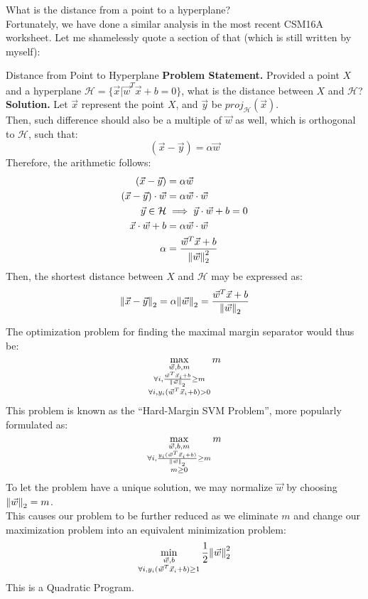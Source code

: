 What is the distance from a point to a hyperplane? \\
Fortunately, we have done a similar analysis in the most recent CSM16A worksheet. Let me shamelessly quote a section of that (which is still written by myself):
\begin{ln-explain}{Distance from Point to Hyperplane}{}
    \textbf{Problem Statement.} Provided a point $X$ and a hyperplane $\mathcal{H} = \{\vec{x} \big| \vec{w}^T \vec{x} + b = 0\}$, what is the distance between $X$ and $\mathcal{H}$?
    \tcblower
    \textbf{Solution.}    
    Let $\vec{x}$ represent the point $X$, and $\vec{y}$ be ${proj}_{\mathcal{H}}(\vec{x})$. \\
    Then, such difference should also be a multiple of $\vec{w}$ as well, which is orthogonal to $\mathcal{H}$, such that:
    \[
        (\vec{x} - \vec{y}) = \alpha \vec{w}
    \]
    Therefore, the arithmetic follows:
    \begin{align*}
        (\vec{x} - \vec{y}) &= \alpha \vec{w} \\
        (\vec{x} - \vec{y}) \cdot \vec{w} &= \alpha \vec{w} \cdot \vec{w} \\
        \vec{y} \in \mathcal{H} &\implies \vec{y} \cdot \vec{w} + b = 0 \\
        \vec{x} \cdot \vec{w} + b &= \alpha \vec{w} \cdot \vec{w} \\
        \alpha &= \frac{\vec{w}^T \vec{x} + b}{\pnorm[2]{\vec{w}}{2}}
    \end{align*}
    Then, the shortest distance between $X$ and $\mathcal{H}$ may be expressed as:
    \[
        \pnorm{\vec{x} - \vec{y}}{2} = \alpha \pnorm{\vec{w}}{2} = \frac{\vec{w}^T \vec{x} + b}{\pnorm{\vec{w}}{2}}
    \]
\end{ln-explain}

The optimization problem for finding the maximal margin separator would thus be:
\[
    \max_{
        \substack{
            \vec{w}, b, m \\
            \forall i, \frac{\vec{w}^T \vec{x}_i + b}{\pnorm{\vec{w}}{2}} \geq m \\
            \forall i, y_i (\vec{w}^T \vec{x}_i + b) > 0
        }
    }
    m
\]
This problem is known as the ``Hard-Margin SVM Problem'', more popularly formulated as:
\[
    \max_{
        \substack{
            \vec{w}, b, m \\
            \forall i, \frac{y_i (\vec{w}^T \vec{x}_i + b)}{\pnorm{\vec{w}}{2}} \geq m \\
            m \geq 0
        }
    }
    m
\]
To let the problem have a unique solution, we may normalize $\vec{w}$ by choosing $\pnorm{\vec{w}}{2} = m$. \\
This causes our problem to be further reduced as we eliminate $m$ and change our maximization problem into an equivalent minimization problem:
\[
    \min_{
        \substack{
            \vec{w}, b \\
            \forall i, y_i (\vec{w}^T \vec{x}_i + b) \geq 1
        }
    }
    \frac{1}{2} \pnorm[2]{\vec{w}}{2}
\]
This is a Quadratic Program.

